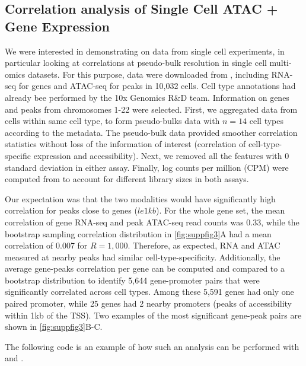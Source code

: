 \documentclass{article}
\begin{document}
\pagebreak

\subsection{Correlation analysis of Single Cell ATAC + Gene Expression}

We were interested in demonstrating \bootranges on data from single
cell experiments, in particular looking at correlations at
pseudo-bulk resolution in single cell multi-omics datasets.
For this purpose, 
data were downloaded from \citet{Vignette}, including
RNA-seq for genes and ATAC-seq for peaks in 10,032 cells.
Cell type annotations had already bee performed
by the 10x Genomics R\&D team. Information on genes and peaks from
chromosomes 1-22 were selected.
First, we aggregated data from cells within same cell type, to form
pseudo-bulks data with $n=14$ cell types according to the metadata. 
The pseudo-bulk data provided smoother correlation statistics without
loss of the information of interest (correlation of cell-type-specific
expression and accessibility).
Next, we removed all the features with 0
standard deviation in either assay.
Finally, log counts per million (CPM) were computed
from   to account for different library sizes
in both assays.

Our expectation was that the two modalities would have
significantly high correlation for peaks close to genes ($le 1kb$).
For the whole gene set, the mean
correlation of gene RNA-seq and peak ATAC-seq read counts was 0.33, while the
bootstrap sampling correlation distribution in \cref{fig:suppfig3}A
had a mean correlation of 0.007 for $R = 1,000$.
Therefore, as expected, RNA and ATAC
measured at nearby peaks had similar cell-type-specificity.
Additionally, the average gene-peaks correlation per gene can be
computed and compared to a bootstrap distribution to identify 5,644
gene-promoter pairs that were significantly correlated across cell
types. Among these 5,591 genes had only one paired promoter, while 25
genes had 2 nearby promoters (peaks of accessibility within 1kb of the
TSS). 
Two examples of the most significant gene-peak pairs are shown in
\cref{fig:suppfig3}B-C.

The following code is an example of how such an analysis can be
performed with \bootranges and \plyranges. 
\end{document}
